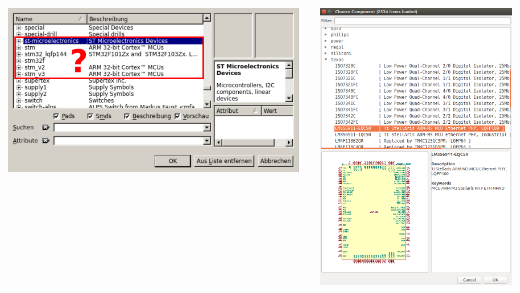 \begin{frame}[noframenumbering]{\secname}
  \begin{columns}[c]
    \begin{column}{.6\textwidth}
      \includegraphics[width=\textwidth]{images/eagle_library_browser.png}
    \end{column}

    \begin{column}{.48\textwidth}
      \includegraphics[width=\textwidth]{images/kicad_library_browser.png}
    \end{column}
  \end{columns}
\end{frame}

